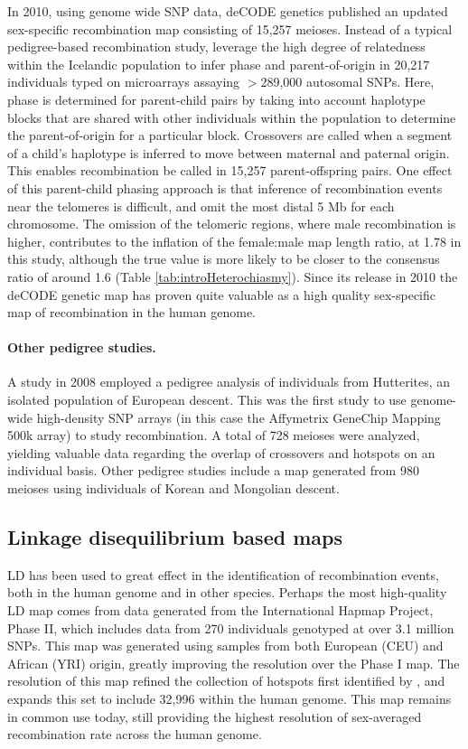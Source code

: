 In 2010, using genome wide SNP data, deCODE genetics published an updated sex-specific recombination map consisting of 15,257 meioses\cite{Kong2010}.
Instead of a typical pedigree-based recombination study, \citet{Kong2010} leverage the high degree of relatedness within the Icelandic population to infer phase and parent-of-origin in 20,217 individuals typed on microarrays assaying $>$289,000 autosomal SNPs.
Here, phase is determined for parent-child pairs by taking into account haplotype blocks that are shared with other individuals within the population to determine the parent-of-origin for a particular block.
Crossovers are called when a segment of a child's haplotype is inferred to move between maternal and paternal origin.
This enables recombination be called in 15,257 parent-offspring pairs.
One effect of this parent-child phasing approach is that inference of recombination events near the telomeres is difficult, and \citet{Kong2010} omit the most distal 5 Mb for each chromosome.
The omission of the telomeric regions, where male recombination is higher, contributes to the inflation of the female:male map length ratio, at 1.78 in this study, although the true value is more likely to be closer to the consensus ratio of around 1.6 (Table \ref{tab:introHeterochiasmy}).
Since its release in 2010 the deCODE genetic map has proven quite valuable as a high quality sex-specific map of recombination in the human genome.


\paragraph{Other pedigree studies.}
A study in 2008 employed a pedigree analysis of individuals from Hutterites, an isolated population of European descent\cite{Coop2008}.
This was the first study to use genome-wide high-density SNP arrays (in this case the Affymetrix GeneChip Mapping 500k array) to study recombination.
A total of 728 meioses were analyzed, yielding valuable data regarding the overlap of crossovers and hotspots on an individual basis.
Other pedigree studies include a map generated from 980 meioses using individuals of Korean and Mongolian descent\cite{Bleazard2013}.

\subsection{Linkage disequilibrium based maps}

LD has been used to great effect in the identification of recombination events, both in the human genome and in other species.
Perhaps the most high-quality LD map comes from data generated from the International Hapmap Project, Phase II\cite{hapmap2007}, which includes data from 270 individuals genotyped at over 3.1 million SNPs.
This map was generated using samples from both European (CEU) and African (YRI) origin, greatly improving the resolution over the Phase I map.
The resolution of this map refined the collection of hotspots first identified by \citet{Myers2005}, and expands this set to include 32,996 within the human genome.
This map remains in common use today, still providing the highest resolution of sex-averaged recombination rate across the human genome.



